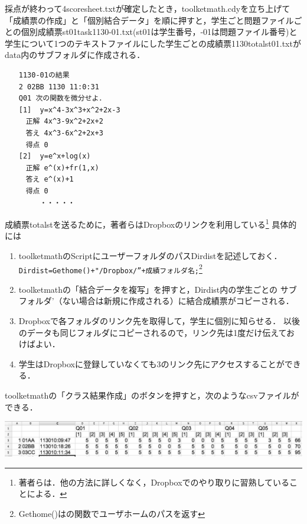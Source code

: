 \documentclass[a4j,12pt]{ujarticle}
\begin{document}
採点が終わって4scoresheet.txtが確定したとき，toolketmath.cdyを立ち上げて
「成績票の作成」と「個別結合データ」を順に押すと，学生ごと問題ファイルごとの個別成績票st01task1130-01.txt(st01は学生番号，-01は問題ファイル番号)と学生について1つのテキストファイルにした学生ごとの成績票1130totalst01.txtがdata内のサブフォルダに作成される．\vspace{-0.5zw}

\begin{verbatim}
　　1130-01の結果
　　2 02BB 1130 11:0:31
　　Q01 次の関数を微分せよ．
　　[1]  y=x^4-3x^3+x^2+2x-3
　　　正解 4x^3-9x^2+2x+2
　　　答え 4x^3-6x^2+2x+3
　　　得点 0
　　[2]  y=e^x+log(x)
　　　正解 e^(x)+fr(1,x)
　　　答え e^(x)+1
　　　得点 0
　　　　　・・・・・
\end{verbatim}
\vspace{-0.5zw}

成績票totalstを送るために，著者らはDropboxのリンクを利用している\footnote{著者らは．他の方法に詳しくなく，Dropboxでのやり取りに習熟していることによる．}
具体的には\vspace{-1mm}

\begin{enumerate}
\item toolketmathのScriptにユーザーフォルダのパスDirdistを記述しておく．\\
\hspace*{2zw}\verb|Dirdist=Gethome()+"/Dropbox/”+成績フォルダ名;|\footnote{Gethome()は\ketcindy の関数でユーザホームのパスを返す}\vspace{-2mm}
\item toolketmathの「結合データを複写」を押すと，Dirdist内の学生ごとの
サブフォルダ’（ない場合は新規に作成される）に結合成績票がコピーされる．
\item Dropboxで各フォルダのリンク先を取得して，学生に個別に知らせる．
以後のデータも同じフォルダにコピーされるので，リンク先は1度だけ伝えておけばよい．\vspace{-2mm}
\item 学生はDropboxに登録していなくても3のリンク先にアクセスすることができる．
\end{enumerate}\vspace{-1mm}

toolketmathの「クラス結果作成」のボタンを押すと，次のようなcsvファイルができる．
\begin{center}
\includegraphics[bb=0.00 0.00 1184.00 141.00,width=140mm]{fig/csvbw.pdf}
\end{center}
\end{document}
